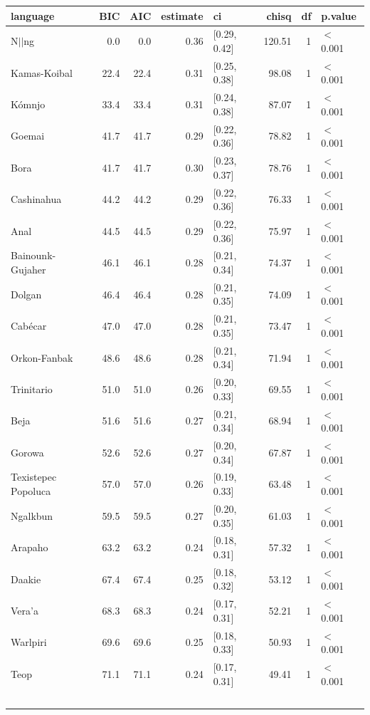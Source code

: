 \begin{table}[ht]
\centering
\begin{tabular}{lrrrlrrl}
  \hline
language & BIC & AIC & estimate & ci & chisq & df & p.value \\ 
  \hline
N$|$$|$ng & 0.0 & 0.0 & 0.36 & [0.29, 0.42] & 120.51 & 1 & $<$ 0.001 \\ 
  Kamas-Koibal & 22.4 & 22.4 & 0.31 & [0.25, 0.38] & 98.08 & 1 & $<$ 0.001 \\ 
  Kómnjo & 33.4 & 33.4 & 0.31 & [0.24, 0.38] & 87.07 & 1 & $<$ 0.001 \\ 
  Goemai & 41.7 & 41.7 & 0.29 & [0.22, 0.36] & 78.82 & 1 & $<$ 0.001 \\ 
  Bora & 41.7 & 41.7 & 0.30 & [0.23, 0.37] & 78.76 & 1 & $<$ 0.001 \\ 
  Cashinahua & 44.2 & 44.2 & 0.29 & [0.22, 0.36] & 76.33 & 1 & $<$ 0.001 \\ 
  Anal & 44.5 & 44.5 & 0.29 & [0.22, 0.36] & 75.97 & 1 & $<$ 0.001 \\ 
  Bainounk-Gujaher & 46.1 & 46.1 & 0.28 & [0.21, 0.34] & 74.37 & 1 & $<$ 0.001 \\ 
  Dolgan & 46.4 & 46.4 & 0.28 & [0.21, 0.35] & 74.09 & 1 & $<$ 0.001 \\ 
  Cabécar & 47.0 & 47.0 & 0.28 & [0.21, 0.35] & 73.47 & 1 & $<$ 0.001 \\ 
  Orkon-Fanbak & 48.6 & 48.6 & 0.28 & [0.21, 0.34] & 71.94 & 1 & $<$ 0.001 \\ 
  Trinitario & 51.0 & 51.0 & 0.26 & [0.20, 0.33] & 69.55 & 1 & $<$ 0.001 \\ 
  Beja & 51.6 & 51.6 & 0.27 & [0.21, 0.34] & 68.94 & 1 & $<$ 0.001 \\ 
  Gorowa & 52.6 & 52.6 & 0.27 & [0.20, 0.34] & 67.87 & 1 & $<$ 0.001 \\ 
  Texistepec Popoluca & 57.0 & 57.0 & 0.26 & [0.19, 0.33] & 63.48 & 1 & $<$ 0.001 \\ 
  Ngalkbun & 59.5 & 59.5 & 0.27 & [0.20, 0.35] & 61.03 & 1 & $<$ 0.001 \\ 
  Arapaho & 63.2 & 63.2 & 0.24 & [0.18, 0.31] & 57.32 & 1 & $<$ 0.001 \\ 
  Daakie & 67.4 & 67.4 & 0.25 & [0.18, 0.32] & 53.12 & 1 & $<$ 0.001 \\ 
  Vera'a & 68.3 & 68.3 & 0.24 & [0.17, 0.31] & 52.21 & 1 & $<$ 0.001 \\ 
  Warlpiri & 69.6 & 69.6 & 0.25 & [0.18, 0.33] & 50.93 & 1 & $<$ 0.001 \\ 
  Teop & 71.1 & 71.1 & 0.24 & [0.17, 0.31] & 49.41 & 1 & $<$ 0.001 \\ 
$$
\end{tabular}
\end{table}
